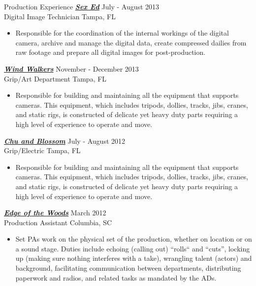 \begin{section}{Production Experience}
  {\textsl \textbf{\href{http://http://www.imdb.com/title/tt2751310}{Sex Ed}}} \hfill July - August 2013 \\
  Digital Image Technician \hfill Tampa, FL
  \begin{itemize}
  \item
    Responsible for the coordination of the internal workings of the digital camera, archive and manage the digital data, create compressed dailies from raw footage and prepare all digital images for post-production.
  \end{itemize}

  {\textsl \textbf{\href{http://www.imdb.com/title/tt1236254}{Wind Walkers}}} \hfill November - December 2013 \\
  Grip/Art Department \hfill Tampa, FL
  \begin{itemize}
  \item
    Responsible for building and maintaining all the equipment that supports cameras. This equipment, which includes tripods, dollies, tracks, jibs, cranes, and static rigs, is constructed of delicate yet heavy duty parts requiring a high level of experience to operate and move.
  \end{itemize}

  {\textsl \textbf{\href{http://www.imdb.com/title/tt2339064}{Chu and Blossom}}} \hfill July - August 2012 \\
  Grip/Electric \hfill Tampa, FL
  \begin{itemize}
  \item
    Responsible for building and maintaining all the equipment that supports cameras. This equipment, which includes tripods, dollies, tracks, jibs, cranes, and static rigs, is constructed of delicate yet heavy duty parts requiring a high level of experience to operate and move.
  \end{itemize}

  {\textsl \textbf{\href{http://www.imdb.com/title/tt3268422}{Edge of the Woods}}} \hfill March 2012 \\
  Production Assistant \hfill Columbia, SC
  \begin{itemize}
  \item
    Set PAs work on the physical set of the production, whether on location or on a sound stage. Duties include echoing (calling out) ``rolls`` and ``cuts'', locking up (making sure nothing interferes with a take), wrangling talent (actors) and background, facilitating communication between departments, distributing paperwork and radios, and related tasks as mandated by the ADs.
  \end{itemize}
\end{section}
